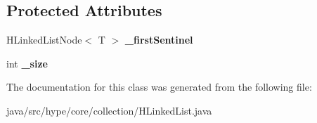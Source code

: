 \subsection*{Protected Attributes}
\begin{DoxyCompactItemize}
\item 
\hypertarget{classhype_1_1core_1_1collection_1_1_h_linked_list_3_01_t_01_4_a80a44a98746e2e2b066dd59d994c2d47}{H\-Linked\-List\-Node$<$ T $>$ {\bfseries \-\_\-first\-Sentinel}}\label{classhype_1_1core_1_1collection_1_1_h_linked_list_3_01_t_01_4_a80a44a98746e2e2b066dd59d994c2d47}

\item 
\hypertarget{classhype_1_1core_1_1collection_1_1_h_linked_list_3_01_t_01_4_ac34bf0d974e90478d207706ab233094b}{int {\bfseries \-\_\-size}}\label{classhype_1_1core_1_1collection_1_1_h_linked_list_3_01_t_01_4_ac34bf0d974e90478d207706ab233094b}

\end{DoxyCompactItemize}


The documentation for this class was generated from the following file\-:\begin{DoxyCompactItemize}
\item 
java/src/hype/core/collection/H\-Linked\-List.\-java\end{DoxyCompactItemize}
